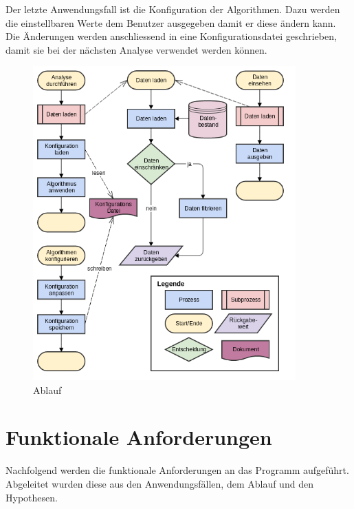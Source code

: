 Der letzte Anwendungsfall ist die Konfiguration der Algorithmen. Dazu werden die einstellbaren Werte dem Benutzer ausgegeben damit er diese ändern kann. Die Änderungen werden anschliessend in eine Konfigurationsdatei geschrieben, damit sie bei der nächsten Analyse verwendet werden können.

\begin{figure}[H]
	\RawFloats
	\centering
	\includegraphics[width=0.9\textwidth]{images/flowchart}
	\caption{Ablauf}
	\label{fig:anfoderungsanalyse:ablauf:1}
\end{figure}

\section{Funktionale Anforderungen}
\label{sec:anforderungsanalyse:funktionaleanforderung}
Nachfolgend werden die funktionale Anforderungen an das Programm aufgeführt. Abgeleitet wurden diese aus den Anwendungsfällen, dem Ablauf und den Hypothesen.

